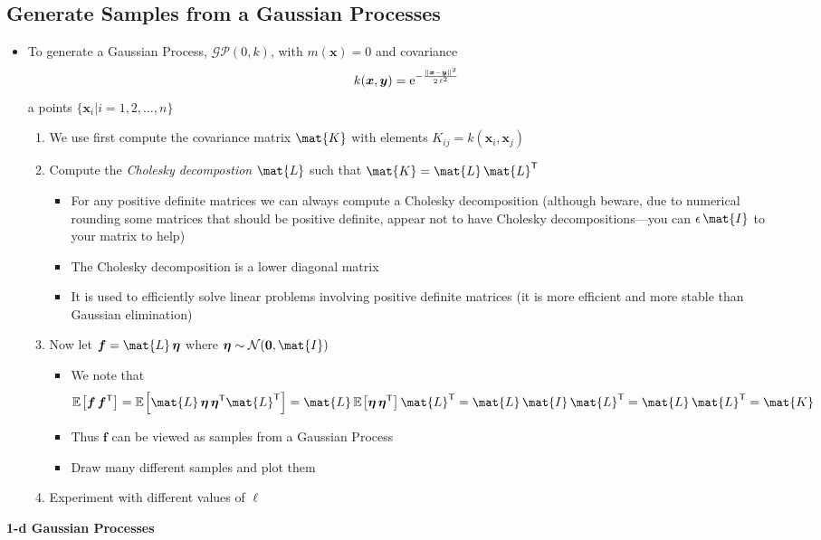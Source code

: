 \documentclass[11pt]{article}
\newcommand{\tr}{\textsf{T}}
\newcommand{\av}[2][]{\mathbb{E}_{#1\!}\left[ #2 \right]}
\newcommand{\e}[1]{{\rm e}^{#1}}
\begin{document}
\subsection{Generate Samples from a Gaussian Processes}
\label{sec:orgb9df890}
\begin{itemize}
\item To generate a Gaussian Process, \(\mathcal{GP}(0,k)\), with
\(m(\bm{x})=0\) and covariance
$$ k(\bm{x},\bm{y})=\e{-\frac{\|\bm{x}-\bm{y}\|^2}{2\,\ell^2}} $$
a points \(\{\bm{x}_i|i=1, 2, \ldots, n\}\)
\begin{enumerate}
\item We use first compute the covariance matrix \(\mat{K}\) with
elements \(K_{ij} = k(\bm{x}_i,\bm{x}_j)\)
\item Compute the \emph{Cholesky decompostion} \(\mat{L}\) such that
\(\mat{K} = \mat{L}\,\mat{L}^\tr\)
\begin{itemize}
\item For any positive definite matrices we can always compute a
Cholesky decomposition (although beware, due to numerical
rounding some matrices that should be positive definite,
appear not to have Cholesky decompositions---you can
\(\epsilon \,\mat{I}\) to your matrix to help)
\item The Cholesky decomposition is a lower diagonal matrix
\item It is used to efficiently solve linear problems involving
positive definite matrices (it is more efficient and more
stable than Gaussian elimination)
\end{itemize}
\item Now let \(\bm{f} = \mat{L}\,\bm{\eta}\) where \(\bm{\eta}\sim
        \mathcal{N}(\bm{0},\mat{I})\)
\begin{itemize}
\item We note that
$$ \av{\bm{f}\,\bm{f}^\tr} = \av{\mat{L}\,\bm{\eta}\,\bm{\eta}^\tr\mat{L}^\tr}
	  = \mat{L}\,\av{\bm{\eta}\,\bm{\eta}^\tr} \mat{L}^\tr
	  = \mat{L}\,\mat{I}\,\mat{L}^\tr =\mat{L}\,\mat{L}^\tr =
          \mat{K} $$
\item Thus \(\bm{f}\) can be viewed as samples from a Gaussian Process
\item Draw many different samples and plot them
\end{itemize}
\item Experiment with different values of \(\ell\)
\end{enumerate}
\end{itemize}

\textbf{1-d Gaussian Processes}
\end{document}
